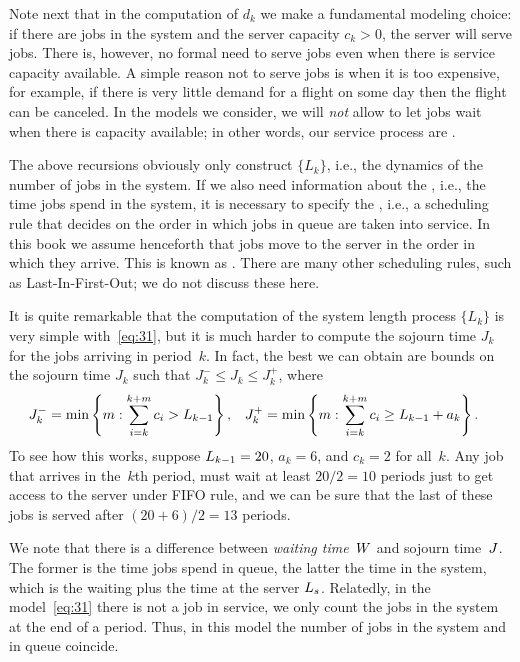 \documentclass[queueing-book.tex]{subfiles}
\begin{document}
Note next that in the computation of $d_{k}$ we make a fundamental modeling choice: if there are jobs in the system and the server capacity $c_{k} > 0$, the server will serve jobs.
There is, however, no formal need to serve jobs even when there is service capacity available.
A simple reason not to serve jobs is when it is too expensive, for example, if there is very little demand for a flight on some day then the flight can be canceled.
In the models we consider, we will \emph{not} allow to let jobs wait when there is capacity available; in other words, our service process are .

The above recursions obviously only construct $\{L_k\}$, i.e., the dynamics of the number of jobs in the system.
If we also need information about the , i.e., the time jobs spend in the system, it is necessary to specify the , i.e., a scheduling rule that decides on the order in which jobs in queue are taken into service.
In this book we assume henceforth that jobs move to the server  in the order in which they arrive.
This is known as .
There are many other scheduling rules, such as Last-In-First-Out; we do not discuss these here.

It is quite remarkable that the computation of the system length process $\{L_{k}\}$ is very simple with~\cref{eq:31}, but it is much harder to compute the sojourn time $J_{k}$ for the jobs arriving in period~$k$.
In fact, the best we can obtain are bounds on the sojourn time $J_{k}$ such that $J_k^{-} \leq J_{k}\leq J_k^{+}$, where
 \begin{align*}
 J_{k}^{-} &= \min\left\{m: \sum_{i=k}^{k+m} c_i > L_{k-1}\right\}, &
 J_{k}^{+} &= \min\left\{m: \sum_{i=k}^{k+m} c_i \geq  L_{k-1}+a_k\right\}.
 \end{align*}
 To see how this works, suppose $L_{k-1}=20$, $a_{k}=6$, and $c_k=2$ for all~$k$.
Any job that arrives in the~$k$th period, must wait at least $20/2 = 10$ periods just to get access to the server under FIFO rule, and we can be sure that the last of these jobs is served after $(20+6)/2=13$ periods.

We note that there is a difference between \emph{waiting time}~$W$ and sojourn time~$J$.
The former is the time jobs spend in queue, the latter the time in the system, which is the waiting plus the time at the server $L_s$.
Relatedly, in the model~\cref{eq:31} there is not a job in service, we only count the jobs in the system at the end of a period. Thus, in this model the number of jobs in the system and in queue coincide.
\end{document}
